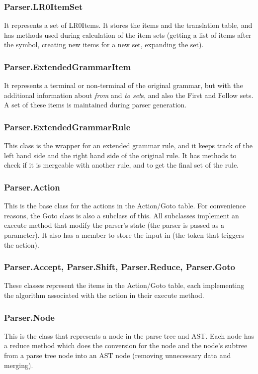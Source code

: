 \subsubsection{Parser.LR0ItemSet}
It represents a set of LR0Items. It stores the items and the translation table, and has methods used during calculation of the item sets (getting a list of items after the \textbullet symbol, creating new items for a new set, expanding the set).
\subsubsection{Parser.ExtendedGrammarItem}
It represents a terminal or non-terminal of the original grammar, but with the additional information about \textit{from} and \textit{to set}s, and also the First and Follow sets. A set of these items is maintained during parser generation.
\subsubsection{Parser.ExtendedGrammarRule}
This class is the wrapper for an extended grammar rule, and it keeps track of the left hand side and the right hand side of the original rule. It has methods to check if it is mergeable with another rule, and to get the final set of the rule.
\subsubsection{Parser.Action}
This is the base class for the actions in the Action/Goto table. For convenience reasons, the Goto class is also a subclass of this. All subclasses implement an execute method that modify the parser's state (the parser is passed as a parameter). It also has a member to store the input in (the token that triggers the action).
\subsubsection{Parser.Accept, Parser.Shift, Parser.Reduce, Parser.Goto}
These classes represent the items in the Action/Goto table, each implementing the algorithm associated with the action in their execute method.
\subsubsection{Parser.Node}
This is the class that represents a node in the parse tree and AST. Each node has a reduce method which does the conversion for the node and the node's subtree from a parse tree node into an AST node (removing unnecessary data and merging).
